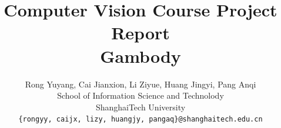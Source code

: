\documentclass[11pt,twocolumn,letterpaper]{article}
\begin{document}
\title{
Computer Vision Course Project Report\\
Gambody
}

\author{Rong Yuyang, Cai Jianxion, Li Ziyue, Huang Jingyi, Pang Anqi\\
School of Information Science and Technolody\\
ShanghaiTech University\\
{\tt\small \{rongyy, caijx, lizy, huangjy, pangaq\}@shanghaitech.edu.cn}
}

\maketitle
\begin{abstract}

\end{abstract}
\end{document}
